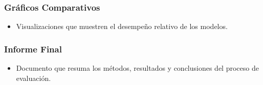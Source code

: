 \documentclass[listof=nochaptergap,12pt,times,authoryear]{report}
\begin{document}
\subsubsection{Gráficos Comparativos}
\begin{itemize}
    \item Visualizaciones que muestren el desempeño relativo de los modelos.
\end{itemize}


\subsubsection{Informe Final}
\begin{itemize}
    \item Documento que resuma los métodos, resultados y conclusiones del proceso de evaluación.
\end{itemize}
\end{document}
